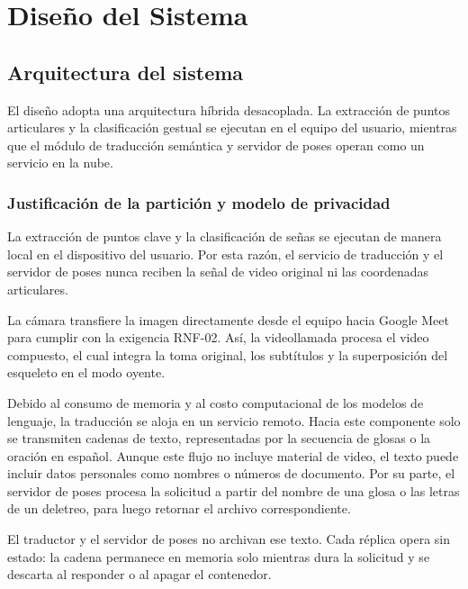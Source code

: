 \chapter{Diseño del Sistema}
\label{cap:diseno_sistema}

\section{Arquitectura del sistema}

El diseño adopta una arquitectura híbrida desacoplada. La extracción de puntos articulares y la clasificación gestual se ejecutan en el equipo del usuario, mientras que el módulo de traducción semántica y servidor de poses operan como un servicio en la nube.

\subsection{Justificación de la partición y modelo de privacidad}
\label{sec:particion_privacidad}
La extracción de puntos clave y la clasificación de señas se ejecutan de manera local en el dispositivo del usuario. Por esta razón, el servicio de traducción y el servidor de poses nunca reciben la señal de video original ni las coordenadas articulares.

La cámara transfiere la imagen directamente desde el equipo hacia Google Meet para cumplir con la exigencia RNF-02. Así, la videollamada procesa el video compuesto, el cual integra la toma original, los subtítulos y la superposición del esqueleto en el modo oyente.

Debido al consumo de memoria y al costo computacional de los modelos de lenguaje, la traducción se aloja en un servicio remoto. Hacia este componente solo se transmiten cadenas de texto, representadas por la secuencia de glosas o la oración en español. Aunque este flujo no incluye material de video, el texto puede incluir datos personales como nombres o números de documento. Por su parte, el servidor de poses procesa la solicitud a partir del nombre de una glosa o las letras de un deletreo, para luego retornar el archivo correspondiente.

El traductor y el servidor de poses no archivan ese texto. Cada réplica opera sin estado: la cadena permanece en memoria solo mientras dura la solicitud y se descarta al responder o al apagar el contenedor.

